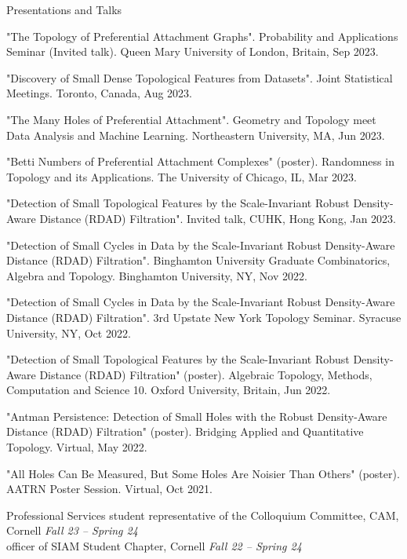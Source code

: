 \documentclass{resume} %
\begin{document}
\begin{rSection}{Presentations and Talks}

"The Topology of Preferential Attachment Graphs". Probability and Applications Seminar (Invited talk). Queen Mary University of London, Britain, Sep 2023.

"Discovery of Small Dense Topological Features from Datasets". Joint Statistical Meetings. Toronto, Canada, Aug 2023.

"The Many Holes of Preferential Attachment". Geometry and Topology meet Data Analysis and Machine Learning. Northeastern University, MA, Jun 2023.

"Betti Numbers of Preferential Attachment Complexes" (poster). Randomness in Topology and its Applications. The University of Chicago, IL, Mar 2023.

"Detection of Small Topological Features by the Scale-Invariant Robust Density-Aware Distance (RDAD) Filtration". Invited talk, CUHK, Hong Kong, Jan 2023.

"Detection of Small Cycles in Data by the Scale-Invariant Robust Density-Aware Distance (RDAD) Filtration". Binghamton University Graduate Combinatorics, Algebra and Topology. Binghamton University, NY, Nov 2022.

"Detection of Small Cycles in Data by the Scale-Invariant Robust Density-Aware Distance (RDAD) Filtration". 3rd Upstate New York Topology Seminar. Syracuse University, NY, Oct 2022.

"Detection of Small Topological Features by the Scale-Invariant Robust Density-Aware Distance (RDAD) Filtration" (poster). Algebraic Topology, Methods, Computation and Science 10. Oxford University, Britain, Jun 2022.

"Antman Persistence: Detection of Small Holes with the Robust Density-Aware Distance (RDAD) Filtration" (poster). Bridging Applied and Quantitative Topology. Virtual, May 2022.

"All Holes Can Be Measured, But Some Holes Are Noisier Than Others" (poster). AATRN Poster Session. Virtual, Oct 2021.

\end{rSection}

\begin{rSection}{Professional Services}
student representative of the Colloquium Committee, CAM, Cornell \hfill {\em Fall 23 -- Spring 24} \\
officer of SIAM Student Chapter, Cornell \hfill {\em Fall 22 -- Spring 24}
\end{rSection}
\end{document}
